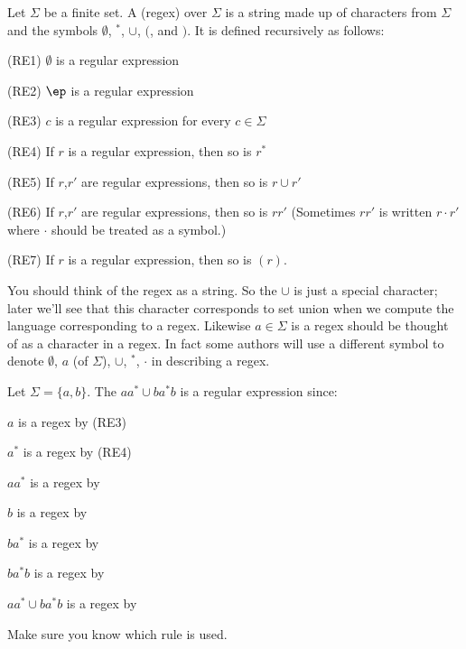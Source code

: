 \begin{defn} Let $\Sigma$ be a finite set. A  (regex) over $\Sigma$ is a string 
made up of characters from $\Sigma$ and the symbols $\emptyset$, 
${}^*$, $\cup$, $($, and $)$.
It is defined 
recursively as follows:
\begin{axioms}
\item[(RE1)] $\emptyset$ is a regular expression
\item[(RE2)] $\ep$ is a regular expression
\item[(RE3)] $c$ is a regular expression for every $c \in \Sigma$
\item[(RE4)] If $r$ is a regular expression, then so is $r^*$
\item[(RE5)] If $r$,$r'$ are regular expressions, then so is $r
  \cup r'$
\item[(RE6)] If $r$,$r'$ are regular expressions, then so is $rr'$
  (Sometimes $rr'$ is written $r \cdot r'$ where $\cdot$
  should be treated as a symbol.)
\item[(RE7)] If $r$ is a regular expression, then so is
$(r)$.
\end{axioms}
\end{defn}

You should think of the regex as a string. So the $\cup$ is just a
special character; later we'll see that this character corresponds
to set union when we compute the language corresponding to a regex.
Likewise $a \in \Sigma$ is a regex should be thought of
as a character in a regex. In fact some authors will use a
different symbol to denote $\emptyset$, $a$ (of $\Sigma$), $\cup$,
${}^*$, $\cdot$ in describing a regex.

\begin{eg}
Let $\Sigma = \{a,b\}$. The $aa^* \cup ba^*b$ is a regular
expression since: 
\begin{tightlist}
 \item $a$ is a regex by (RE3)
 \item $a^*$ is a regex by (RE4)
 \item $aa^*$ is a regex by  
 \item $b$ is a regex by 
 \item $ba^*$ is a regex by
 \item $ba^*b$ is a regex by 
 \item $aa^* \cup ba^*b$ is a regex by
\end{tightlist}
Make sure you know which rule is used.
\end{eg}

